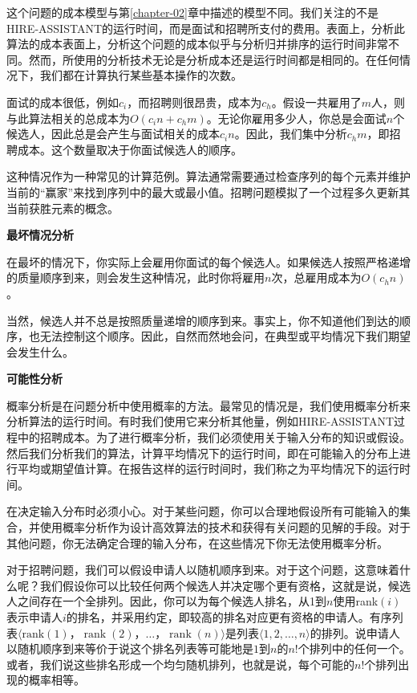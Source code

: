 \documentclass[lang=cn,newtx,10pt,scheme=chinese]{elegantbook}
\begin{document}
这个问题的成本模型与第\ref{chapter-02}章中描述的模型不同。我们关注的不是HIRE-ASSISTANT的运行时间，而是面试和招聘所支付的费用。表面上，分析此算法的成本表面上，分析这个问题的成本似乎与分析归并排序的运行时间非常不同。然而，所使用的分析技术无论是分析成本还是运行时间都是相同的。在任何情况下，我们都在计算执行某些基本操作的次数。

面试的成本很低，例如$c_i$，而招聘则很昂贵，成本为$c_h$。假设一共雇用了$m$人，则与此算法相关的总成本为$O(c_i n+c_h m)$。无论你雇用多少人，你总是会面试$n$个候选人，因此总是会产生与面试相关的成本$c_i n$。因此，我们集中分析$c_h m$，即招聘成本。这个数量取决于你面试候选人的顺序。

这种情况作为一种常见的计算范例。算法通常需要通过检查序列的每个元素并维护当前的``赢家''来找到序列中的最大或最小值。招聘问题模拟了一个过程多久更新其当前获胜元素的概念。

\textbf{最坏情况分析}

在最坏的情况下，你实际上会雇用你面试的每个候选人。如果候选人按照严格递增的质量顺序到来，则会发生这种情况，此时你将雇用$n$次，总雇用成本为$O(c_h n)$。

当然，候选人并不总是按照质量递增的顺序到来。事实上，你不知道他们到达的顺序，也无法控制这个顺序。因此，自然而然地会问，在典型或平均情况下我们期望会发生什么。

\textbf{可能性分析}

概率分析是在问题分析中使用概率的方法。最常见的情况是，我们使用概率分析来分析算法的运行时间。有时我们使用它来分析其他量，例如HIRE-ASSISTANT过程中的招聘成本。为了进行概率分析，我们必须使用关于输入分布的知识或假设。然后我们分析我们的算法，计算平均情况下的运行时间，即在可能输入的分布上进行平均或期望值计算。在报告这样的运行时间时，我们称之为平均情况下的运行时间。

在决定输入分布时必须小心。对于某些问题，你可以合理地假设所有可能输入的集合，并使用概率分析作为设计高效算法的技术和获得有关问题的见解的手段。对于其他问题，你无法确定合理的输入分布，在这些情况下你无法使用概率分析。

对于招聘问题，我们可以假设申请人以随机顺序到来。对于这个问题，这意味着什么呢？我们假设你可以比较任何两个候选人并决定哪个更有资格，这就是说，候选人之间存在一个全排列。因此，你可以为每个候选人排名，从1到$n$使用rank$(i)$表示申请人$i$的排名，并采用约定，即较高的排名对应更有资格的申请人。有序列表$\langle\operatorname{rank(1)}$，$\operatorname{rank}(2)$，$\ldots$，$\operatorname{rank}(n)\rangle$是列表$\langle 1,2,\ldots,n\rangle$的排列。说申请人以随机顺序到来等价于说这个排名列表等可能地是$1$到$n$的$n$!个排列中的任何一个。或者，我们说这些排名形成一个均匀随机排列，也就是说，每个可能的$n!$个排列出现的概率相等。
\end{document}
